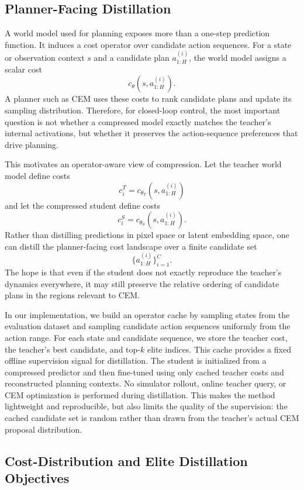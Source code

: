 \documentclass[11pt]{article}
\begin{document}
\subsection{Planner-Facing Distillation}

A world model used for planning exposes more than a one-step prediction function. It induces a cost operator over candidate action sequences. For a state or observation context $s$ and a candidate plan $a_{1:H}^{(i)}$, the world model assigns a scalar cost
\[
    c_\theta(s, a_{1:H}^{(i)}).
\]
A planner such as CEM uses these costs to rank candidate plans and update its sampling distribution. Therefore, for closed-loop control, the most important question is not whether a compressed model exactly matches the teacher's internal activations, but whether it preserves the action-sequence preferences that drive planning.

This motivates an operator-aware view of compression. Let the teacher world model define costs
\[
    c_i^T = c_{\theta_T}(s, a_{1:H}^{(i)})
\]
and let the compressed student define costs
\[
    c_i^S = c_{\theta_S}(s, a_{1:H}^{(i)}).
\]
Rather than distilling predictions in pixel space or latent embedding space, one can distill the planner-facing cost landscape over a finite candidate set
\[
    \{a_{1:H}^{(i)}\}_{i=1}^C.
\]
The hope is that even if the student does not exactly reproduce the teacher's dynamics everywhere, it may still preserve the relative ordering of candidate plans in the regions relevant to CEM.

In our implementation, we build an operator cache by sampling states from the evaluation dataset and sampling candidate action sequences uniformly from the action range. For each state and candidate sequence, we store the teacher cost, the teacher's best candidate, and top-$k$ elite indices. This cache provides a fixed offline supervision signal for distillation. The student is initialized from a compressed predictor and then fine-tuned using only cached teacher costs and reconstructed planning contexts. No simulator rollout, online teacher query, or CEM optimization is performed during distillation. This makes the method lightweight and reproducible, but also limits the quality of the supervision: the cached candidate set is random rather than drawn from the teacher's actual CEM proposal distribution.

\subsection{Cost-Distribution and Elite Distillation Objectives}
\end{document}
